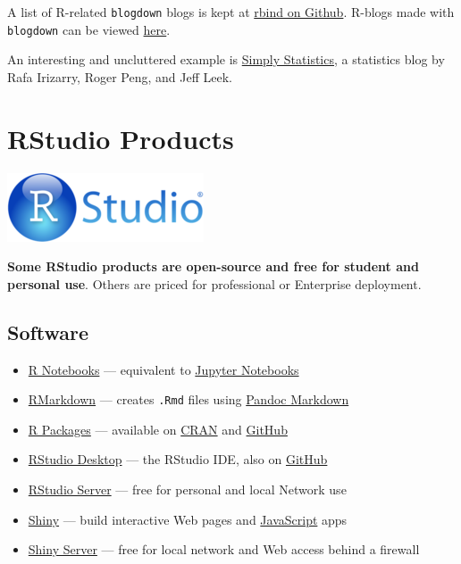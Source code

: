 \documentclass[]{book}
\providecommand{\tightlist}{%
  \setlength{\itemsep}{0pt}\setlength{\parskip}{0pt}}
\theoremstyle{definition}
\theoremstyle{definition}
\theoremstyle{definition}
\theoremstyle{remark}
\begin{document}
A list of R-related \texttt{blogdown} blogs is kept at
\href{https://github.com/rbind}{rbind on Github}. R-blogs made with
\texttt{blogdown} can be viewed
\href{https://github.com/search?q=org\%3Arbind+blogdown}{here}.

An interesting and uncluttered example is
\href{https://simplystatistics.org/}{Simply Statistics}, a statistics
blog by Rafa Irizarry, Roger Peng, and Jeff Leek.

\hypertarget{rstudio-products}{%
\section{RStudio Products}\label{rstudio-products}}

\includegraphics{images/RStudio_full_logo.png}

\textbf{Some RStudio products are open-source and free for student and
personal use}. Others are priced for professional or Enterprise
deployment.

\hypertarget{software}{%
\subsection{Software}\label{software}}

\begin{itemize}
\tightlist
\item
  \href{https://rmarkdown.rstudio.com/r_notebooks.html}{R Notebooks} ---
  equivalent to \href{https://jupyter.org/}{Jupyter Notebooks}
\item
  \href{https://rmarkdown.rstudio.com/}{RMarkdown} --- creates
  \texttt{.Rmd} files using
  \href{https://rmarkdown.rstudio.com/authoring_pandoc_markdown.html}{Pandoc
  Markdown}
\item
  \href{https://www.rstudio.com/products/rpackages/}{R Packages} ---
  available on \href{https://cran.r-project.org/}{CRAN} and
  \href{https://github.com/rstudio}{GitHub}
\item
  \href{https://www.rstudio.com/products/rstudio/\#Desktop}{RStudio
  Desktop} --- the RStudio IDE, also on
  \href{https://github.com/rstudio}{GitHub}
\item
  \href{https://www.rstudio.com/products/rstudio/\#Server}{RStudio
  Server} --- free for personal and local Network use
\item
  \href{https://www.rstudio.com/products/shiny/}{Shiny} --- build
  interactive Web pages and
  \href{https://www.javascript.com}{JavaScript} apps
\item
  \href{https://www.rstudio.com/products/shiny/shiny-server2/}{Shiny
  Server} --- free for local network and Web access behind a firewall
\end{itemize}
\end{document}
